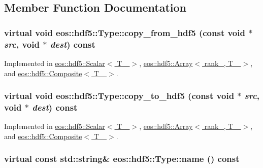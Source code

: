 \subsection{Member Function Documentation}
\hypertarget{structeos_1_1hdf5_1_1Type_a4d1073336bce1500533e69a1187acd66}{
\subsubsection[{copy\_\-from\_\-hdf5}]{\setlength{\rightskip}{0pt plus 5cm}virtual void eos::hdf5::Type::copy\_\-from\_\-hdf5 (const void $\ast$ {\em src}, \/  void $\ast$ {\em dest}) const}}
\label{structeos_1_1hdf5_1_1Type_a4d1073336bce1500533e69a1187acd66}


Implemented in \hyperlink{classeos_1_1hdf5_1_1Scalar_a840b94c45ff51454eb2baae727165a71}{eos::hdf5::Scalar$<$ T\_\- $>$}, \hyperlink{classeos_1_1hdf5_1_1Array_aedd48f5a8020d66426bd0adfc74fa6a9}{eos::hdf5::Array$<$ rank\_\-, T\_\- $>$}, and \hyperlink{classeos_1_1hdf5_1_1Composite_a4504f18af7ad323f89b4635eae9f1695}{eos::hdf5::Composite$<$ T\_\- $>$}.\hypertarget{structeos_1_1hdf5_1_1Type_a30b665dc2adbe459feb640c61776b50a}{
\subsubsection[{copy\_\-to\_\-hdf5}]{\setlength{\rightskip}{0pt plus 5cm}virtual void eos::hdf5::Type::copy\_\-to\_\-hdf5 (const void $\ast$ {\em src}, \/  void $\ast$ {\em dest}) const}}
\label{structeos_1_1hdf5_1_1Type_a30b665dc2adbe459feb640c61776b50a}


Implemented in \hyperlink{classeos_1_1hdf5_1_1Scalar_a4aeec2eb655199bd6ad02464eeb44648}{eos::hdf5::Scalar$<$ T\_\- $>$}, \hyperlink{classeos_1_1hdf5_1_1Array_a4f0adbcb6e7136436afa14aee7ebc5c9}{eos::hdf5::Array$<$ rank\_\-, T\_\- $>$}, and \hyperlink{classeos_1_1hdf5_1_1Composite_ac86859046bcb7b5741afdb5ec13e78f0}{eos::hdf5::Composite$<$ T\_\- $>$}.\hypertarget{structeos_1_1hdf5_1_1Type_a79de1c9f0444de59864107c388c23d2d}{
\subsubsection[{name}]{\setlength{\rightskip}{0pt plus 5cm}virtual const std::string\& eos::hdf5::Type::name () const}}
\label{structeos_1_1hdf5_1_1Type_a79de1c9f0444de59864107c388c23d2d}


